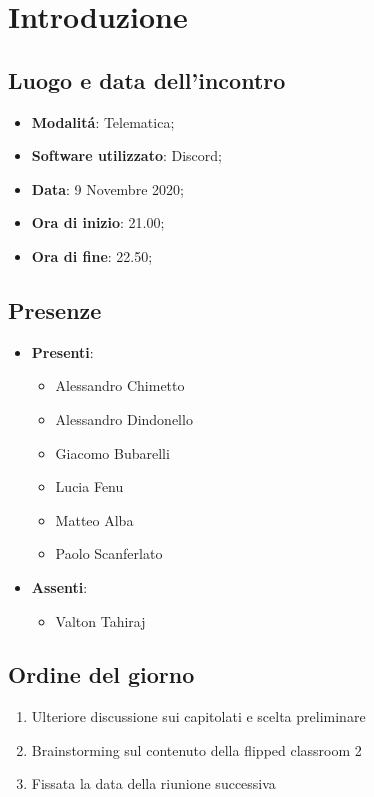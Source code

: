 \documentclass[]{article}
\begin{document}
	
	
	
	\newpage


	\section{Introduzione}
	\subsection{Luogo e data dell'incontro}
	\begin{itemize}
		\item \textbf{Modalitá}: Telematica;
		\item \textbf{Software utilizzato}: Discord;
		\item \textbf{Data}: 9 Novembre 2020;
		\item \textbf{Ora di inizio}: 21.00;
		\item \textbf{Ora di fine}: 22.50;
	\end{itemize}

	\subsection{Presenze}
	\begin{itemize}
		\item \textbf{Presenti}: 
		\begin{itemize}
			\item Alessandro Chimetto
			\item Alessandro Dindonello
			\item Giacomo Bubarelli
			\item Lucia Fenu
			\item Matteo Alba
			\item Paolo Scanferlato
		\end{itemize}
		\item \textbf{Assenti}: 
		\begin{itemize}
			\item Valton Tahiraj
		\end{itemize}
	\end{itemize}


	\subsection{Ordine del giorno}
	\begin{enumerate}
		\item Ulteriore discussione sui capitolati e scelta preliminare
		\item Brainstorming sul contenuto della flipped classroom 2
		\item Fissata la data della riunione successiva
	\end{enumerate}
\end{document}
